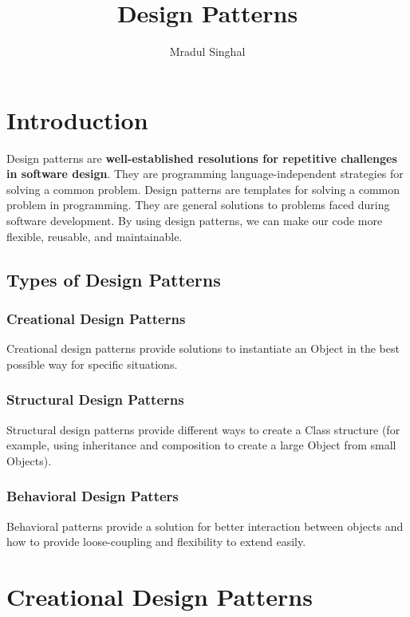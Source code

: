 \documentclass{article}
\title{Design Patterns}
\author{Mradul Singhal}
\begin{document}
\maketitle
\newpage

\tableofcontents
\newpage

\section{Introduction}
Design patterns are \textbf{well-established resolutions for repetitive challenges in software design}. They are programming language-independent strategies for solving a common problem. Design patterns are templates for solving a common problem in programming. They are general solutions to problems faced during software development. By using design patterns, we can make our code more flexible, reusable, and maintainable.
\subsection{Types of Design Patterns}
\subsubsection{Creational Design Patterns}
Creational design patterns provide solutions to instantiate an Object in the best possible way for specific situations.
\subsubsection{Structural Design Patterns}
Structural design patterns provide different ways to create a Class structure (for example, using inheritance and composition to create a large Object from small Objects).
\subsubsection{Behavioral Design Patters}
Behavioral patterns provide a solution for better interaction between objects and how to provide loose-coupling and flexibility to extend easily.
\newpage

\section{Creational Design Patterns}
\end{document}
